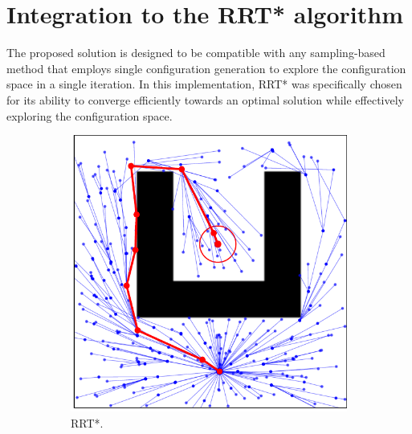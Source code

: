 \documentclass{ctuthesis}
\begin{document}
\section{Integration to the RRT* algorithm}

The proposed solution is designed to be compatible with any sampling-based method 
that employs single configuration generation to explore the configuration space 
in a single iteration. 
In this implementation, RRT* was specifically chosen for its ability to converge 
efficiently towards an optimal solution while effectively exploring the configuration space. 
\begin{figure}[!ht]
  \centering 
  \begin{subfigure}[b]{0.45\textwidth}
      \includegraphics[width=\textwidth]{figChap4/RRTstar_maze216.0.pdf}
      \caption{RRT*.}
      \label{fig:rrtstar_maze}
  \end{subfigure}  
  \begin{subfigure}[b]{0.45\textwidth}

\end{subfigure}
\end{figure}
\end{document}
